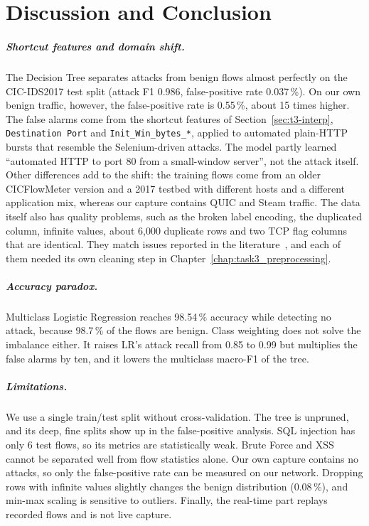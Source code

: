 \chapter{Discussion and Conclusion}\label{chap:discussion}

\paragraph{Shortcut features and domain shift.} The Decision Tree separates attacks from benign flows almost perfectly on the CIC-IDS2017 test split (attack F1 0.986, false-positive rate 0.037\,\%). On our own benign traffic, however, the false-positive rate is 0.55\,\%, about 15 times higher. The false alarms come from the shortcut features of Section~\ref{sec:t3-interp}, \texttt{Destination Port} and \texttt{Init\_Win\_bytes\_*}, applied to automated plain-HTTP bursts that resemble the Selenium-driven attacks. The model partly learned ``automated HTTP to port 80 from a small-window server'', not the attack itself. Other differences add to the shift: the training flows come from an older CICFlowMeter version and a 2017 testbed with different hosts and a different application mix, whereas our capture contains QUIC and Steam traffic. The data itself also has quality problems, such as the broken label encoding, the duplicated column, infinite values, about 6,000 duplicate rows and two TCP flag columns that are identical. They match issues reported in the literature~\cite{engelen2021troubleshooting}, and each of them needed its own cleaning step in Chapter~\ref{chap:task3_preprocessing}.

\paragraph{Accuracy paradox.} Multiclass Logistic Regression reaches 98.54\,\% accuracy while detecting no attack, because 98.7\,\% of the flows are benign. Class weighting does not solve the imbalance either. It raises LR's attack recall from 0.85 to 0.99 but multiplies the false alarms by ten, and it lowers the multiclass macro-F1 of the tree.

\paragraph{Limitations.} We use a single train/test split without cross-validation. The tree is unpruned, and its deep, fine splits show up in the false-positive analysis. SQL injection has only 6 test flows, so its metrics are statistically weak. Brute Force and XSS cannot be separated well from flow statistics alone. Our own capture contains no attacks, so only the false-positive rate can be measured on our network. Dropping rows with infinite values slightly changes the benign distribution (0.08\,\%), and min-max scaling is sensitive to outliers. Finally, the real-time part replays recorded flows and is not live capture.

